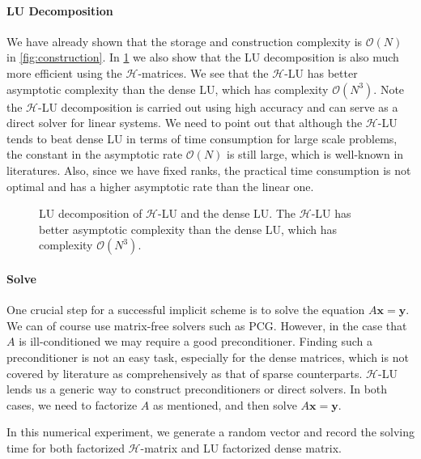 \documentclass[10pt,a4paper]{article}
\newcommand{\bx}[0]{\mathbf{x}}
\theoremstyle{definition}
\newcommand{\by}[0]{\mathbf{y}}
\begin{document}
\paragraph{LU Decomposition}

We have already shown that the storage and construction complexity is $\mathcal{O}(N)$ in \cref{fig:construction}. In \cref{fig:lu} we also show that the LU decomposition is also much more efficient using the $\mathcal{H}$-matrices. We see that the $\mathcal{H}$-LU has better asymptotic complexity than the dense LU, which has complexity $\mathcal{O}(N^3)$. Note the $\mathcal{H}$-LU decomposition is carried out using high accuracy and can serve as a direct solver for linear systems. We need to point out that although the $\mathcal{H}$-LU tends to beat dense LU in terms of time consumption for large scale problems, the constant in the asymptotic rate $\mathcal{O}(N)$ is still large, which is well-known in literatures. Also, since we have fixed ranks, the practical time consumption is not optimal and has a higher asymptotic rate than the linear one. 

\begin{figure}[htpb]
\centering
\scalebox{0.6}{}
\caption{LU decomposition of $\mathcal{H}$-LU and the dense LU. The $\mathcal{H}$-LU has better asymptotic complexity than the dense LU, which has complexity $\mathcal{O}(N^3)$.}
\label{fig:lu}
\end{figure}



\paragraph{Solve}

One crucial step for a successful implicit scheme is to solve the equation $A\bx=\by$. We can of course use matrix-free solvers such as PCG. However, in the case that $A$ is ill-conditioned we may require a good preconditioner. Finding such a preconditioner is not an easy task, especially for the dense matrices, which is not covered by literature as comprehensively as that of sparse counterparts. $\mathcal{H}$-LU lends us a generic way to construct preconditioners or direct solvers. In both cases, we need to factorize $A$ as mentioned, and then solve $A\bx=\by$. 

In this numerical experiment, we generate a random vector and record the solving time for both factorized $\mathcal{H}$-matrix and LU factorized dense matrix. 
\end{document}
